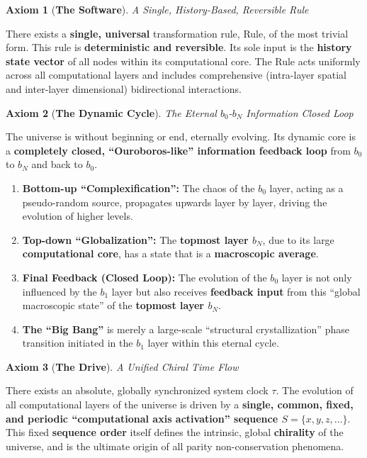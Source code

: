 \documentclass[11pt, a4paper]{article}
\newtheorem{axiom}{Axiom}[section]
\begin{document}
\begin{axiom}[\textbf{The Software}]
A Single, History-Based, Reversible Rule
\end{axiom}
There exists a \textbf{single, universal} transformation rule, Rule, of the most trivial form. This rule is \textbf{deterministic and reversible}. Its sole input is the \textbf{history state vector} of all nodes within its computational core. The Rule acts uniformly across all computational layers and includes comprehensive (intra-layer spatial and inter-layer dimensional) bidirectional interactions.

\begin{axiom}[\textbf{The Dynamic Cycle}]
The Eternal $b_0$-$b_N$ Information Closed Loop
\end{axiom}
The universe is without beginning or end, eternally evolving. Its dynamic core is a \textbf{completely closed, ``Ouroboros-like'' information feedback loop} from $b_0$ to $b_N$ and back to $b_0$.
\begin{enumerate}
    \item \textbf{Bottom-up ``Complexification'':} The chaos of the $b_0$ layer, acting as a pseudo-random source, propagates upwards layer by layer, driving the evolution of higher levels.
    \item \textbf{Top-down ``Globalization'':} The \textbf{topmost layer $b_N$}, due to its large \textbf{computational core}, has a state that is a \textbf{macroscopic average}.
    \item \textbf{Final Feedback (Closed Loop):} The evolution of the $b_0$ layer is not only influenced by the $b_1$ layer but also receives \textbf{feedback input} from this ``global macroscopic state'' of the \textbf{topmost layer $b_N$}.
    \item \textbf{The ``Big Bang''} is merely a large-scale ``structural crystallization'' phase transition initiated in the $b_1$ layer within this eternal cycle.
\end{enumerate}

\begin{axiom}[\textbf{The Drive}]
A Unified Chiral Time Flow
\end{axiom}
There exists an absolute, globally synchronized system clock $\tau$. The evolution of all computational layers of the universe is driven by a \textbf{single, common, fixed, and periodic ``computational axis activation'' sequence $S = \{x, y, z, \dots\}$}. This fixed \textbf{sequence order} itself defines the intrinsic, global \textbf{chirality} of the universe, and is the ultimate origin of all parity non-conservation phenomena.
\end{document}
